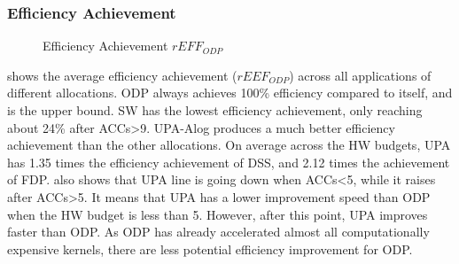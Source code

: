 \subsubsection{Efficiency Achievement}
\label{subsubsec:overall-oop}

\begin{figure}[h]
\vspace{-8pt}
	\centering
		\hfill
	\vspace{-8pt}
	\caption{Efficiency Achievement $rEFF_{ODP}$}
	\label{fig:overalloop}
\end{figure}

 shows the average efficiency achievement ($rEEF_{ODP}$) across all applications of different allocations. 
ODP always achieves 100\% efficiency compared to itself, and is the upper bound.
SW has the lowest efficiency achievement, only reaching about 24\% after ACCs>9. 
UPA-Alog produces a much better efficiency achievement than the other allocations.
On average across the HW budgets, UPA has 1.35 times the efficiency achievement of DSS, and 2.12 times the achievement of FDP.
 also shows that UPA line is going down when ACCs<5, while it raises after ACCs>5. It means that UPA has a lower improvement speed than ODP when the HW budget is less than 5. However, after this point, UPA improves faster than ODP. As ODP has already accelerated almost all computationally expensive kernels, there are less potential efficiency improvement for ODP.  


